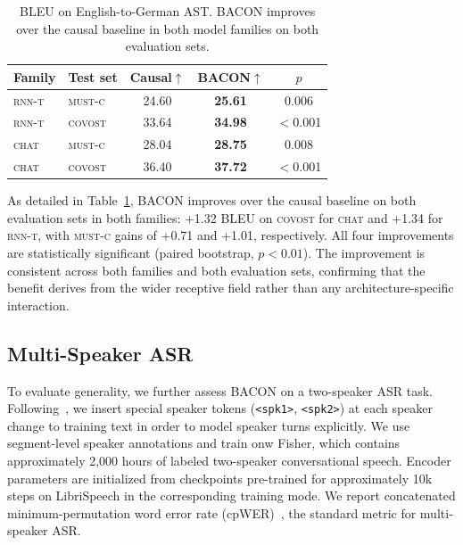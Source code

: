 \documentclass[cameraready]{Interspeech}
\begin{document}
\begin{table}[h]
\centering
\caption{BLEU on English-to-German AST. BACON improves over the causal
baseline in both model families on both evaluation sets.}
\label{tab:chunk_conv_bleu}
\begin{tabular}{llccc}
\toprule
\textbf{Family} & \textbf{Test set} & \textbf{Causal}$\uparrow$ & \textbf{BACON}$\uparrow$ & $p$ \\
\midrule
\textsc{rnn-t} & \textsc{must-c} & 24.60 & \textbf{25.61} & 0.006 \\
\textsc{rnn-t} & \textsc{covost} & 33.64 & \textbf{34.98} & $<$0.001 \\
\midrule
\textsc{chat} & \textsc{must-c} & 28.04 & \textbf{28.75} & 0.008 \\
\textsc{chat} & \textsc{covost} & 36.40 & \textbf{37.72} & $<$0.001 \\
\bottomrule
\end{tabular}
\end{table}

As detailed in Table~\ref{tab:chunk_conv_bleu}, BACON improves over the causal baseline on both evaluation sets in both families:
+1.32 BLEU on \textsc{covost} for \textsc{chat} and +1.34 for \textsc{rnn-t},
with \textsc{must-c} gains of +0.71 and +1.01, respectively. All four improvements are statistically significant (paired bootstrap, $p<0.01$).
The improvement is consistent across both families and both evaluation sets, confirming that the
benefit derives from the wider receptive field rather than any
architecture-specific interaction.

\subsection{Multi-Speaker ASR}
\label{subsec:multispk}

To evaluate generality, we further assess BACON on a two-speaker ASR task.
Following~\cite{wang2024resource}, we insert special speaker
tokens (\texttt{<spk1>}, \texttt{<spk2>}) at each speaker change to training text in order to model
speaker turns explicitly. We use segment-level speaker annotations and train onw
Fisher, which contains approximately 2,000 hours of
labeled two-speaker conversational speech. Encoder parameters are initialized
from checkpoints pre-trained for approximately 10k steps on LibriSpeech in the
corresponding training mode. We report concatenated minimum-permutation word
error rate (cpWER)~\cite{watanabe2020chime}, the standard metric for
multi-speaker ASR.
\end{document}
